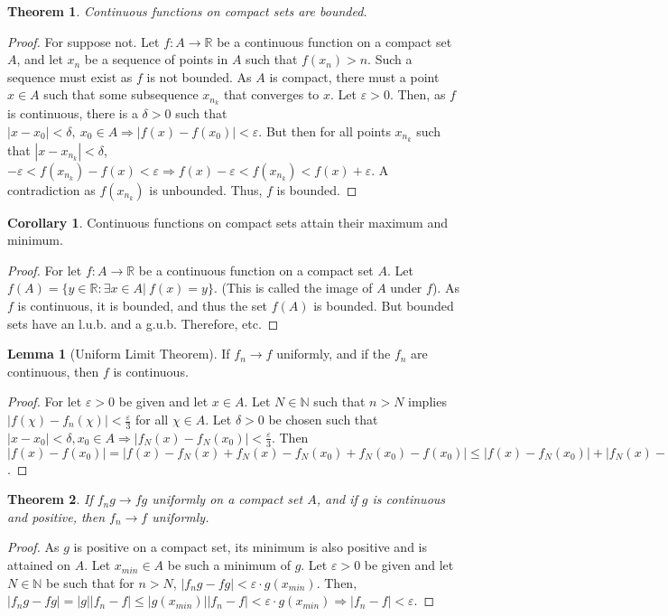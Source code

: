 \documentclass[oneside]{book}
\newtheorem{theorem}{Theorem}[section]
\theoremstyle{definition}
\newtheorem{lemma}{Lemma}[section]
\newtheorem{corollary}{Corollary}[section]
\begin{document}
\begin{theorem}
Continuous functions on compact sets are bounded.
\end{theorem}
\begin{proof}
For suppose not. Let $f:A\rightarrow \mathbb{R}$ be a continuous function on a compact set $A$, and let $x_n$ be a sequence of points in $A$ such that $f(x_n)>n$. Such a sequence must exist as $f$ is not bounded. As $A$ is compact, there must a point $x\in A$ such that some subsequence $x_{n_k}$ that converges to $x$. Let $\varepsilon >0$. Then, as $f$ is continuous, there is a $\delta>0$ such that $|x-x_0|<\delta,\ x_0\in A\Rightarrow |f(x)-f(x_0)|<\varepsilon$. But then for all points $x_{n_k}$ such that $|x-x_{n_k}|<\delta$, $-\varepsilon<f(x_{n_k})-f(x)<\varepsilon \Rightarrow f(x)-\varepsilon < f(x_{n_k})<f(x)+\varepsilon$. A contradiction as $f(x_{n_k})$ is unbounded. Thus, $f$ is bounded.
\end{proof}

\begin{corollary}
Continuous functions on compact sets attain their maximum and minimum.
\end{corollary}
\begin{proof}
For let $f:A\rightarrow \mathbb{R}$ be a continuous function on a compact set $A$. Let $f(A) = \{y\in \mathbb{R}:\exists x\in A|\ f(x)=y\}$. (This is called the image of $A$ under $f$). As $f$ is continuous, it is bounded, and thus the set $f(A)$ is bounded. But bounded sets have an l.u.b. and a g.u.b. Therefore, etc.
\end{proof}

\begin{lemma}[Uniform Limit Theorem]
If $f_n\rightarrow f$ uniformly, and if the $f_n$ are continuous, then $f$ is continuous.
\end{lemma}
\begin{proof}
For let $\varepsilon>0$ be given and let $x\in A$. Let $N\in \mathbb{N}$ such that $n>N$ implies $|f(\chi)-f_n(\chi)|<\frac{\varepsilon}{3}$ for all $\chi\in A$. Let $\delta>0$ be chosen such that $|x-x_0|<\delta, x_0\in A\Rightarrow |f_N(x)-f_N(x_0)|<\frac{\varepsilon}{3}$. Then  $|f(x)-f(x_0)|=|f(x)-f_N(x)+f_N(x)-f_N(x_0)+f_N(x_0)-f(x_0)|\leq |f(x)-f_N(x_0)|+|f_N(x)-f_N(x_0)|+|f(x_0)-f_N(x_0)|<\varepsilon$.
\end{proof}

\begin{theorem}
If $f_ng\rightarrow fg$ uniformly on a compact set $A$, and if $g$ is continuous and positive, then $f_n\rightarrow f$ uniformly.
\end{theorem}
\begin{proof}
As $g$ is positive on a compact set, its minimum is also positive and is attained on $A$. Let $x_{min}\in A$ be such a minimum of $g$. Let $\varepsilon>0$ be given and let $N\in \mathbb{N}$ be such that for $n>N$, $|f_ng-fg|<\varepsilon\cdot g(x_{min})$. Then, $|f_ng-fg|=|g||f_n-f|\leq |g(x_{min})||f_n-f|<\varepsilon \cdot g(x_{min})\Rightarrow |f_n-f|<\varepsilon$.
\end{proof}
\end{document}
